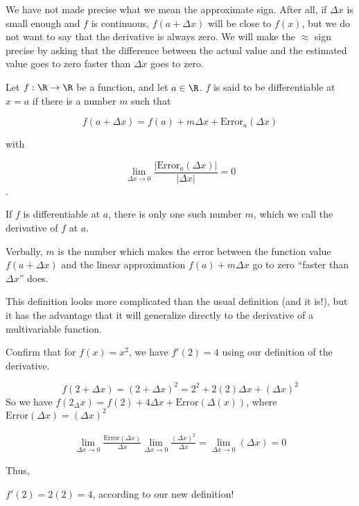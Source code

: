 \documentclass{ximera}
\begin{document}
We have not made precise what we mean the approximate sign.  After all, if $\Delta x$ is small enough and $f$ is continuous, 
$f(a+\Delta x)$ will be close to $f(x)$, but we do not want to say that the derivative is always zero.  We will make the  $\approx$ sign precise by asking that the difference 
between the actual value and the estimated value goes to zero faster than $\Delta x$ goes to zero.

\begin{definition}
  Let $f: \R \to \R$ be a function, and let $a \in \R$.  $f$ is said to be differentiable at $x=a$ if there is a number $m$ such that 
  
  \[ f(a+\Delta x) = f(a) + m\Delta x + \text{Error}_a(\Delta x)\]
  
  with
  
  \[ \lim_{\Delta x \to 0} \frac{\left|\text{Error}_a(\Delta x)\right|}{\left|\Delta x\right|} = 0 \].
  
  If $f$ is differentiable at $a$, there is only one such number $m$, which we call the derivative of $f$ at $a$.  
  
  Verbally,  $m$ is the number which makes the error between the function value $f(a+\Delta x)$ and the linear approximation $f(a)+m\Delta x$ go to zero 
  ``faster than $\Delta x$'' does.
\end{definition}

This definition looks more complicated than the usual definition (and it is!), but it has the advantage that it will 
generalize directly to the derivative of a multivariable function.
	

Confirm that for $f(x)=x^2$, we have $f'(2)=4$ using our definition of the derivative.
	
\begin{free-response}
  \[
  f(2+\Delta x) = (2+\Delta x)^2 = 2^2+2(2)\Delta x + (\Delta x)^2
  \]
  So we have $f(2_\Delta x) = f(2)+4\Delta x + \text{Error}(\Delta(x))$, where $\text{Error}(\Delta x) = (\Delta x)^2$
  
  \begin{align*}
    \lim_{\Delta x \to 0} \frac{\text{Error}(\Delta x)}{\Delta x}
    \lim_{\Delta x \to 0} \frac{(\Delta x)^2}{\Delta x} 
    = \lim_{\Delta x \to 0} \left(\Delta x  \right)
    = 0
  \end{align*}
  
  Thus, 
  
  $f'(2) = 2(2) =4$, according to our new definition!
\end{free-response}
\end{document}
